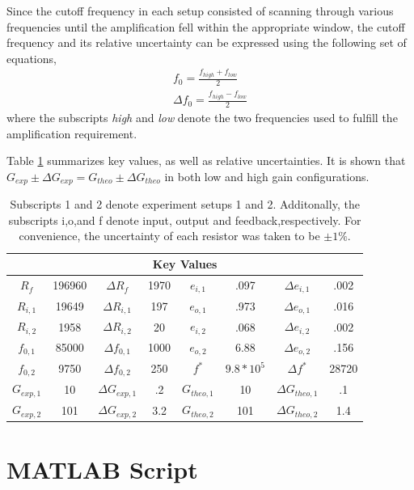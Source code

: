 \documentclass[letterpaper,12pt]{article}
\begin{document}
Since the cutoff frequency in each setup consisted of scanning through various frequencies until the amplification fell within the appropriate window, the cutoff frequency and its relative uncertainty can be expressed using the following set of equations,
\begin{equation}
    \begin{split}
        f_0 = \frac{f_{high} + f_{low}}{2}\\
        \Delta f_0 = \frac{f_{high} - f_{low}}{2}
    \end{split}
\end{equation}
where the subscripts \textit{high} and \textit{low} denote the two frequencies used to fulfill the amplification requirement.

Table \ref{KeyValues} summarizes key values, as well as relative uncertainties. It is shown that $G_{exp} \pm{\Delta G_{exp}} = G_{theo} \pm{\Delta G_{theo}}$ in both low and high gain configurations.
\begin{table}[ht]
    \centering
    \begin{tabular}{ c | c | c | c ||c | c | c | c }
    \multicolumn{8}{c}{Key Values} \\
    \hline
    $R_f$ & 196960 & $\Delta R_f$ & 1970 & $e_{i,1}$ & .097 & $\Delta e_{i,1}$ & .002  \\
    $R_{i,1}$ & 19649 & $\Delta R_{i,1}$ & 197 & $e_{o,1}$ & .973 & $\Delta e_{o,1}$ & .016    \\
    $R_{i,2}$ & 1958 & $\Delta R_{i,2}$ & 20 & $e_{i,2}$ & .068 & $\Delta e_{i,2}$ & .002     \\
    $f_{0,1}$ & 85000 & $\Delta f_{0,1}$ & 1000 & $e_{o,2}$ & 6.88 & $\Delta e_{o,2}$ & .156  \\
    $f_{0,2}$ & 9750 & $\Delta f_{0,2}$ & 250 &  $f^*$ & $9.8*10^{5}$ & $\Delta f^*$ & 28720  \\
    \hline
    $G_{exp,1}$ & 10 & $\Delta G_{exp,1}$ & .2 & $G_{theo,1}$ & 10 & $\Delta G_{theo,1}$ & .1 \\
    $G_{exp,2}$ & 101 & $\Delta G_{exp,2}$ & 3.2 & $G_{theo,2}$ & 101 & $\Delta G_{theo,2}$ & 1.4 
    \end{tabular}
    \caption{\small Subscripts 1 and 2 denote experiment setups 1 and 2. Additonally, the subscripts i,o,and f denote input, output and feedback,respectively. For convenience, the uncertainty of each resistor was taken to be $\pm{1\%}$.}
    \label{KeyValues}
\end{table}

\newpage
\appendix
\section{MATLAB Script}

\end{document}
